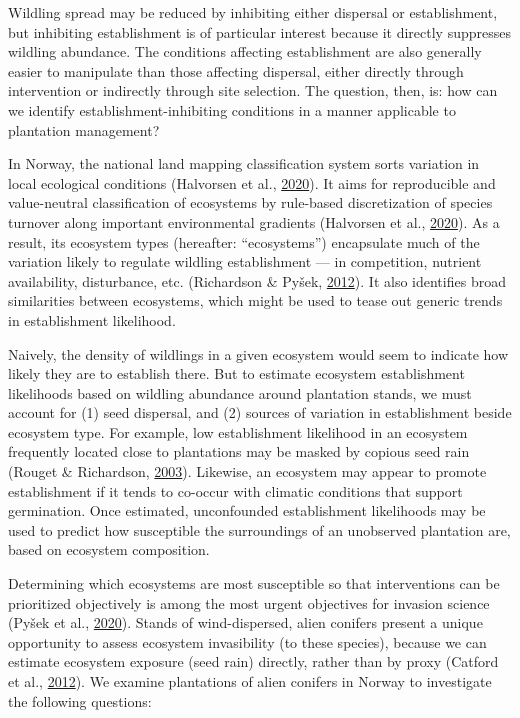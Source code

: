 \documentclass[
]{article}
\begin{document}
Wildling spread may be reduced by inhibiting either dispersal or establishment, but inhibiting establishment is of particular interest because it directly suppresses wildling abundance.
The conditions affecting establishment are also generally easier to manipulate than those affecting dispersal, either directly through intervention or indirectly through site selection.
The question, then, is: how can we identify establishment-inhibiting conditions in a manner applicable to plantation management?

In Norway, the national land mapping classification system sorts variation in local ecological conditions (Halvorsen et al., \protect\hyperlink{ref-halvorsenSystematicsEcodiversityEcoSyst2020}{2020}).
It aims for reproducible and value-neutral classification of ecosystems by rule-based discretization of species turnover along important environmental gradients (Halvorsen et al., \protect\hyperlink{ref-halvorsenSystematicsEcodiversityEcoSyst2020}{2020}).
As a result, its ecosystem types (hereafter: ``ecosystems'') encapsulate much of the variation likely to regulate wildling establishment --- in competition, nutrient availability, disturbance, etc. (Richardson \& Pyšek, \protect\hyperlink{ref-richardsonNaturalizationIntroducedPlants2012}{2012}).
It also identifies broad similarities between ecosystems, which might be used to tease out generic trends in establishment likelihood.

Naively, the density of wildlings in a given ecosystem would seem to indicate how likely they are to establish there.
But to estimate ecosystem establishment likelihoods based on wildling abundance around plantation stands, we must account for (1) seed dispersal, and (2) sources of variation in establishment beside ecosystem type.
For example, low establishment likelihood in an ecosystem frequently located close to plantations may be masked by copious seed rain (Rouget \& Richardson, \protect\hyperlink{ref-rougetInferringProcessPattern2003}{2003}).
Likewise, an ecosystem may appear to promote establishment if it tends to co-occur with climatic conditions that support germination.
Once estimated, unconfounded establishment likelihoods may be used to predict how susceptible the surroundings of an unobserved plantation are, based on ecosystem composition.

Determining which ecosystems are most susceptible so that interventions can be prioritized objectively is among the most urgent objectives for invasion science (Pyšek et al., \protect\hyperlink{ref-pysekScientistsWarningInvasive2020}{2020}).
Stands of wind-dispersed, alien conifers present a unique opportunity to assess ecosystem invasibility (to these species), because we can estimate ecosystem exposure (seed rain) directly, rather than by proxy (Catford et al., \protect\hyperlink{ref-catfordQuantifyingLevelsBiological2012}{2012}).
We examine plantations of alien conifers in Norway to investigate the following questions:
\end{document}

